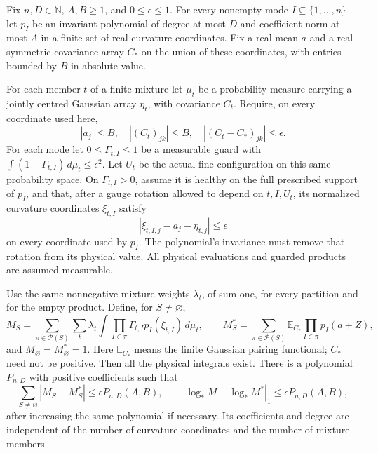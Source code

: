 \begin{lemma}
\label{lem:allarity-guarded-gaussian}
Fix $n,D\in\mathbb N$, $A,B\ge1$, and $0\le\epsilon\le1$.
For every nonempty mode $I\subseteq\{1,\ldots,n\}$ let $p_I$ be an
invariant polynomial of degree at most $D$ and coefficient norm at most
$A$ in a finite set of real curvature coordinates. Fix a real mean $a$
and a real symmetric covariance array $C_*$ on the union of these
coordinates, with entries bounded by $B$ in absolute value.

For each member $t$ of a finite mixture let $\mu_t$ be a probability
measure carrying a jointly centred Gaussian array $\eta_t$, with
covariance $C_t$. Require, on every coordinate used here,
\[
 |a_j|\le B,\quad |(C_t)_{jk}|\le B,\quad
                         |(C_t-C_*)_{jk}|\le\epsilon.
\]
For each mode let $0\le\Gamma_{t,I}\le1$ be a measurable guard with
$\int(1-\Gamma_{t,I})\,d\mu_t\le\epsilon^2$.
Let $U_t$ be the actual fine configuration on this same probability
space. On $\Gamma_{t,I}>0$, assume it is healthy on the full prescribed
support of $p_I$, and that, after a gauge rotation allowed to depend on
$t,I,U_t$, its normalized curvature coordinates $\xi_{t,I}$ satisfy
\[
                 |\xi_{t,I,j}-a_j-\eta_{t,j}|\le\epsilon
\]
on every coordinate used by $p_I$. The polynomial's invariance must
remove that rotation from its physical value. All physical evaluations
and guarded products are assumed measurable.

Use the same nonnegative mixture weights $\lambda_t$, of sum one,
for every partition and for the empty product. Define, for $S\ne\varnothing$,
\[
 M_S=\sum_{\pi\in\mathcal P(S)}\sum_t\lambda_t
       \int\prod_{I\in\pi}\Gamma_{t,I}p_I(\xi_{t,I})\,d\mu_t,
 \qquad
 M^*_S=\sum_{\pi\in\mathcal P(S)}
       \mathbb E_{C_*}\prod_{I\in\pi}p_I(a+Z),
\]
and $M_\varnothing=M^*_\varnothing=1$. Here $\mathbb E_{C_*}$ means
the finite Gaussian pairing functional; $C_*$ need not be positive.
Then all the physical integrals exist.
There is a polynomial $P_{n,D}$ with positive coefficients such that
\[
 \sum_{S\ne\varnothing}|M_S-M^*_S|
              \le\epsilon P_{n,D}(A,B),\qquad
 \left|\log_*M-\log_*M^*\right|_1
              \le\epsilon P_{n,D}(A,B),
\]
after increasing the same polynomial if necessary. Its coefficients and
degree are independent of the number of curvature coordinates and the
number of mixture members.
\end{lemma}
